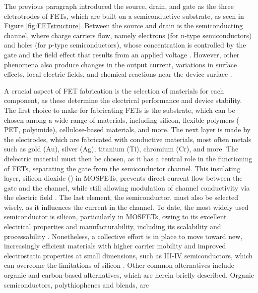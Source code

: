 The previous paragraph introduced the source, drain, and gate as the three
eletrotrodes of FETs, which are built on a semiconductive substrate, as seen in
Figure \ref{fig:FETstructure}. Between the source and drain is the
semiconducting channel, where charge carriers flow, namely electrons (for n-type
semiconductors) and holes (for p-type semiconductors), whose concentration is
controlled by the gate and the field effect that results from an applied voltage
\citep{liChemical2019, shkodraElectrolytegated2021}. However, other phenomena
also produce changes in the output current, \eg{} variations in surface effects,
local electric fields, and chemical reactions near the device surface
\citep{sangProgress2016, shkodraElectrolytegated2021}.

A crucial aspect of FET fabrication is the selection of materials for each
component, as these determine the electrical performance and device stability.
The first choice to make for fabricating FETs is the substrate, which can be
chosen among a wide range of materials, including silicon, flexible polymers
(\eg{} PET, polyimide), cellulose-based materials, and more. The next layer is
made by the electrodes, which are fabricated with conductive materials, most
often metals such as gold (Au), silver (Ag), titanium (Ti), chromium (Cr), and
more. The dielectric material must then be chosen, as it has a central role in
the functioning of FETs, separating the gate from the semiconductor channel.
This insulating layer, \eg{} silicon dioxide () in MOSFETs, prevents
direct current flow between the gate and the channel, while still allowing
modulation of channel conductivity via the electric field \citep{ortizHighk2010,
wangHighk2018}. The last element, \ie{} the semiconductor, must also be selected
wisely, as it influences the current in the channel. To date, the most widely
used semiconductor is silicon, particularly in MOSFETs, owing to its excellent
electrical properties and manufacturability, including its scalability and
processability \citep{zahoorCarbon2023, heywangSilicon2004,
guptaSemiconductor2016}. Nonetheless, a collective effort is in place to move
toward new, increasingly efficient materials with higher carrier mobility and
improved electrostatic properties at small dimensions, such as III-IV
semiconductors, which can overcome the limitations of silicon
\citep{chelliahCurrent2017, delalamoNanometrescale2011}. Other common
alternatives include organic and carbon-based alternatives, which are herein
briefly described. Organic semiconductors, \eg{} polythiophenes and blends, are
